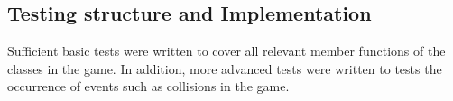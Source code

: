 \documentclass[10pt,twocolumn]{witseiepaper}
\begin{document}











\subsection{Testing structure and Implementation}

Sufficient basic tests were written to cover all relevant member functions of the classes in the game. In addition, more advanced tests were written to tests the occurrence of events such as collisions in the game. 
\end{document}
